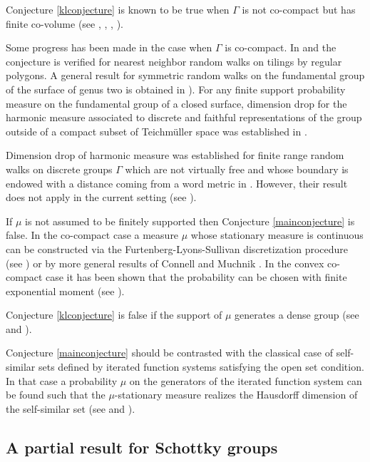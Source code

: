 \documentclass{article}
\begin{document}
Conjecture \ref{klconjecture} is known to be true when \(\Gamma\) is not co-compact but has finite co-volume (see \cite{guivarch-lejan}, \cite{bhm}, \cite{dkn}, \cite{gadre-maher-tiozzo}).  

Some progress has been made in the case when \(\Gamma\) is co-compact.  In \cite{carrasco-lessa-paquette} and \cite{kosenko} the conjecture is verified for nearest neighbor random walks on tilings by regular polygons.  A general result for symmetric random walks on the fundamental group of the surface of genus two is obtained in \cite{tk2020}).  For any finite support probability measure on the fundamental group of a closed surface, dimension drop for the harmonic measure associated to discrete and faithful representations of the group outside of a compact subset of Teichmüller space was established in \cite{aimpaper}.

Dimension drop of harmonic measure was established for finite range random walks on discrete groups \(\Gamma\) which are not virtually free and whose boundary is endowed with a distance coming from a word metric in \cite[Theorem 1.1]{gmm}.  However, their result does not apply in the current setting (see \cite[Remark 1.1]{gmm}).

If \(\mu\) is not assumed to be finitely supported then Conjecture \ref{mainconjecture} is false.   In the co-compact case a measure \(\mu\) whose stationary measure is continuous can be constructed via the Furtenberg-Lyons-Sullivan discretization procedure (see \cite{lyons-sullivan}) or by more general results of Connell and Muchnik \cite{connell-muchnik}.   In the convex co-compact case it has been shown that the probability can be chosen with finite exponential moment (see \cite[Appendix]{li}).

Conjecture \ref{klconjecture} is false if the support of \(\mu\) generates a dense group (see \cite{bourgain} and \cite{barany-pollicott-simon}).

Conjecture \ref{mainconjecture} should be contrasted with the classical case of self-similar sets defined by iterated function systems satisfying the open set condition.  In that case a probability \(\mu\) on the generators of the iterated function system can be found such that the \(\mu\)-stationary measure realizes the Hausdorff dimension of the self-similar set (see \cite{moran} and \cite{hutchinson}).

\subsection{A partial result for Schottky groups}
\end{document}
